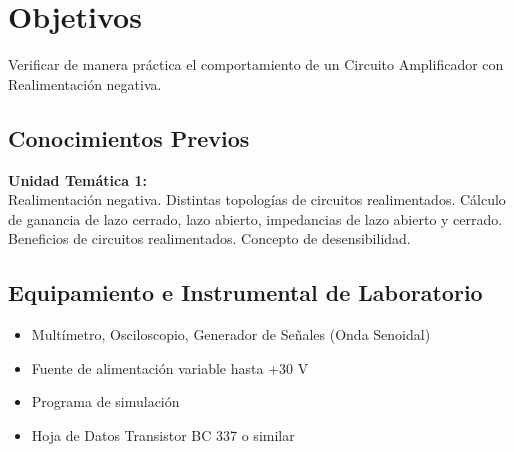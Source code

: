 \chapter{Objetivos}
Verificar de manera práctica el comportamiento de un Circuito Amplificador con Realimentación negativa.

\section{Conocimientos Previos}
\textbf{Unidad Temática 1:}\\
Realimentación negativa. Distintas topologías de circuitos realimentados. Cálculo de ganancia de lazo cerrado, lazo abierto, impedancias de lazo abierto y cerrado. Beneficios de circuitos realimentados. Concepto de desensibilidad.

\section{Equipamiento e Instrumental de Laboratorio}
\begin{itemize}
    \item Multímetro, Osciloscopio, Generador de Señales (Onda Senoidal)
    \item Fuente de alimentación variable hasta +30 V
    \item Programa de simulación
    \item Hoja de Datos Transistor BC 337 o similar
\end{itemize}
